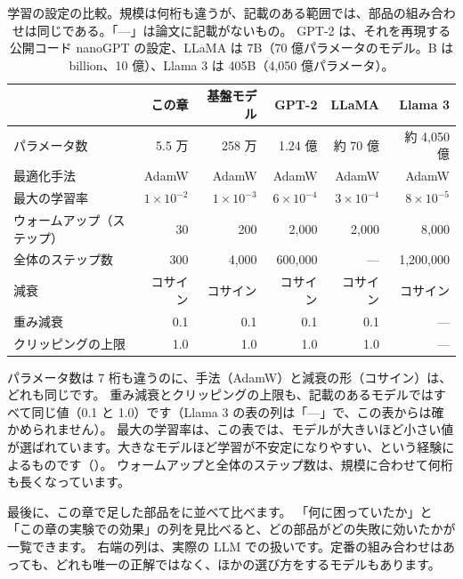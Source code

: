\begin{table}[tbp]
\centering
\caption{学習の設定の比較。規模は何桁も違うが、記載のある範囲では、部品の組み合わせは同じである。「—」は論文に記載がないもの。
GPT-2 は、それを再現する公開コード nanoGPT の設定\cite{karpathy2022nanogpt}、LLaMA は 7B（70 億パラメータのモデル。B は billion、10 億）\cite{touvron2023llama}、Llama 3 は 405B（4,050 億パラメータ）\cite{dubey2024llama3}。}
\label{tab:training-scale}
\small
\begin{tabular}{lrrrrr}
\toprule
 & この章 & 基盤モデル & GPT-2 & LLaMA & Llama 3 \\
\midrule
パラメータ数 & 5.5 万 & 258 万 & 1.24 億 & 約 70 億 & 約 4,050 億 \\
最適化手法 & AdamW & AdamW & AdamW & AdamW & AdamW \\
最大の学習率 & $1\times10^{-2}$ & $1\times10^{-3}$ & $6\times10^{-4}$ & $3\times10^{-4}$ & $8\times10^{-5}$ \\
ウォームアップ（ステップ） & 30 & 200 & 2,000 & 2,000 & 8,000 \\
全体のステップ数 & 300 & 4,000 & 600,000 & — & 1,200,000 \\
減衰 & コサイン & コサイン & コサイン & コサイン & コサイン \\
重み減衰 & 0.1 & 0.1 & 0.1 & 0.1 & — \\
クリッピングの上限 & 1.0 & 1.0 & 1.0 & 1.0 & — \\
\bottomrule
\end{tabular}
\end{table}

パラメータ数は 7 桁も違うのに、手法（AdamW）と減衰の形（コサイン）は、どれも同じです。
重み減衰とクリッピングの上限も、記載のあるモデルではすべて同じ値（0.1 と 1.0）です（Llama 3 の表の列は「—」で、この表からは確かめられません）。
最大の学習率は、この表では、モデルが大きいほど小さい値が選ばれています。大きなモデルほど学習が不安定になりやすい、という経験によるものです（）。
ウォームアップと全体のステップ数は、規模に合わせて何桁も長くなっています。

最後に、この章で足した部品をに並べて比べます。
「何に困っていたか」と「この章の実験での効果」の列を見比べると、どの部品がどの失敗に効いたかが一覧できます。
右端の列は、実際の LLM での扱いです。定番の組み合わせはあっても、どれも唯一の正解ではなく、ほかの選び方をするモデルもあります。

